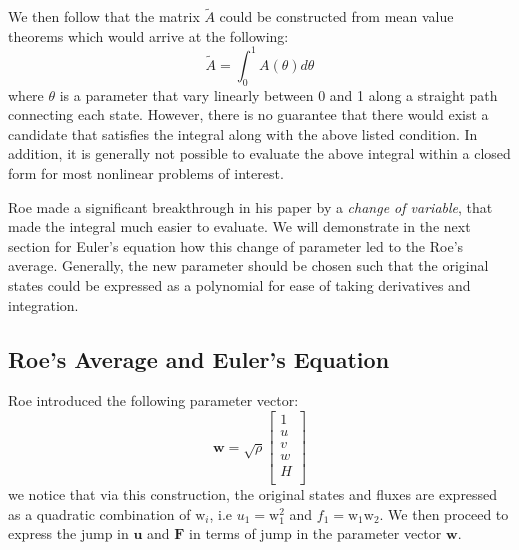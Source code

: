 \documentclass[a4paper]{article}
\numberwithin{equation}{section}
\begin{document}
We then follow that the matrix $\tilde{A}$ could be constructed from mean value theorems which would arrive at the following:
\begin{equation}
    \tilde{A} = \int_0^1 A(\theta) d \theta
\end{equation}
where $\theta$ is a parameter that vary linearly between 0 and 1 along a straight path connecting each state. However, there is no guarantee that there would exist a candidate that satisfies the integral along with the above listed condition. In addition, it is generally not possible to evaluate the above integral within a closed form for most nonlinear problems of interest.

Roe made a significant breakthrough in his paper by a \textit{change of variable}, that made the integral much easier to evaluate. We will demonstrate in the next section for Euler's equation how this change of parameter led to the Roe's average. Generally, the new parameter should be chosen such that the original states could be expressed as a polynomial for ease of taking derivatives and integration.

\subsection{Roe's Average and  Euler's Equation}
Roe introduced the following parameter vector:
\begin{equation}
    \mathbf{w} = \sqrt{\rho} 
    \begin{bmatrix}
        1\\
        u\\
        v\\
        w\\
        H\\
    \end{bmatrix}
\end{equation}
we notice that via this construction, the original states and fluxes are expressed as a quadratic combination of $\mathrm{w}_i$, i.e $u_1 = \mathrm{w}_1^2$ and $f_1 = \mathrm{w}_1 \mathrm{w}_2$. We then proceed to express the jump in $\mathbf{u}$ and $\mathbf{F}$ in terms of jump in the parameter vector $\mathbf{w}$.
\end{document}
